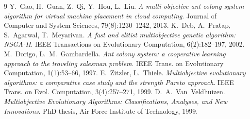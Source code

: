 \documentclass[11pt]{article}
\begin{document}
\begin{thebibliography}{9}
\small
{} Y.~Gao, H.~Guan, Z.~Qi, Y.~Hou, L.~Liu.
\emph{A multi-objective ant colony system algorithm for virtual machine placement
in cloud computing}. Journal of Computer and System Sciences, 79(8):1230--1242, 2013.
 K.~Deb, A.~Pratap, S.~Agarwal, T.~Meyarivan.
\emph{A fast and elitist multiobjective genetic algorithm: NSGA-II}.
IEEE Transactions on Evolutionary Computation, 6(2):182--197, 2002.
 M.~Dorigo, L.~M.~Gambardella.
\emph{Ant colony system: a cooperative learning approach to the traveling
salesman problem}. IEEE Trans. on Evolutionary Computation, 1(1):53--66, 1997.
 E.~Zitzler, L.~Thiele.
\emph{Multiobjective evolutionary algorithms: a comparative case study and the
strength Pareto approach}. IEEE Trans. on Evol. Computation, 3(4):257--271, 1999.
 D.~A.~Van~Veldhuizen.
\emph{Multiobjective Evolutionary Algorithms: Classifications, Analyses, and New
Innovations}. PhD thesis, Air Force Institute of Technology, 1999.
\end{thebibliography}
\end{document}
